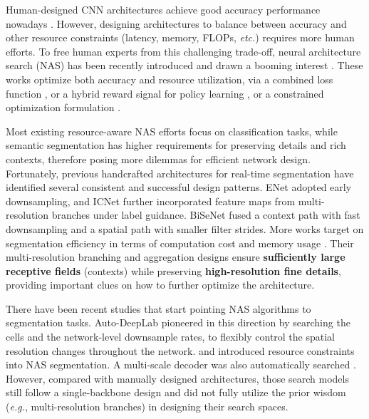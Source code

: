\documentclass{article} \usepackage{iclr2020_conference,times}
\begin{document}
Human-designed CNN architectures achieve good accuracy performance nowadays \citep{he2016deep,chen2018encoder,wang2019deep,sun2019deep}. However, designing architectures to balance between accuracy and other resource constraints (latency, memory, FLOPs, \textit{etc.}) requires more human efforts. To free human experts from this challenging trade-off, neural architecture search (NAS) has been recently introduced and drawn a booming interest \citep{zoph2016neural,brock2017smash,pham2018efficient,liu2018progressive,chen2018searching,bender2018understanding,chen2018joint,gong2019autogan}.
These works optimize both accuracy and resource utilization, via a combined loss function \citep{wu2019fbnet}, or a hybrid reward signal for policy learning \citep{tan2019mnasnet,cheng2018instanas}, or a constrained optimization formulation \citep{dai2019chamnet}.



Most existing resource-aware NAS efforts focus on classification tasks, while semantic segmentation has higher requirements for preserving details and rich contexts, therefore posing more dilemmas for efficient network design. Fortunately, previous handcrafted architectures for real-time segmentation have identified several consistent and successful design patterns. ENet \citep{paszke2016enet} adopted early downsampling, and ICNet \citep{zhao2018icnet} further incorporated feature maps from multi-resolution branches under label guidance. BiSeNet \citep{yu2018bisenet} fused a context path with fast downsampling and a spatial path with smaller filter strides.
More works target on segmentation efficiency in terms of computation cost \citep{he2019knowledge,marin2019efficient} and memory usage \citep{chen2019collaborative}.
Their multi-resolution branching and aggregation designs ensure \textbf{sufficiently large receptive fields} (contexts) while preserving \textbf{high-resolution fine details}, providing important clues on how to further optimize the architecture.

There have been recent studies that start pointing NAS algorithms to segmentation tasks. Auto-DeepLab \citep{liu2019auto} pioneered in this direction by searching the cells and the network-level downsample rates, to flexibly control the spatial resolution changes throughout the network. \citet{zhang2019customizable} and \citet{li2019partial} introduced resource constraints into NAS segmentation. A multi-scale decoder was also automatically searched \citep{zhang2019customizable}. 
However, compared with manually designed architectures, those search models still follow a single-backbone design and did not fully utilize the prior wisdom (\textit{e.g.}, multi-resolution branches) in designing their search spaces.
\end{document}
